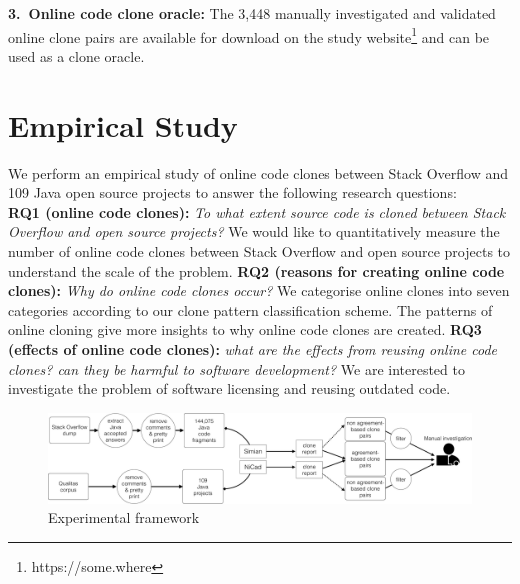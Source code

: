 \documentclass{sig-alternate-05-2015}
\begin{document}
\vspace{0.5ex}%
\noindent\textbf{3.~Online code clone oracle:} The 3,448 manually investigated and validated online clone pairs are available for download on the study website\footnote{https://some.where} and can be used as a clone oracle.

\section{Empirical Study}
We perform an empirical study of online code clones between Stack Overflow and 109 Java open source projects to answer the following research questions: \\ 
\textbf{RQ1 (online code clones):} \textit{To what extent  source code is cloned between Stack Overflow and open source projects?} We would like to quantitatively measure the number of online code clones between Stack Overflow and open source projects to understand the scale of the problem. \newline
\textbf{RQ2 (reasons for creating online code clones):} \textit{Why do online code clones occur?} We categorise online clones into seven categories according to our clone pattern classification scheme. The patterns of online cloning give more insights to why online code clones are created. %
\newline
\textbf{RQ3 (effects of online code clones):} \textit{what are the effects from reusing online code clones? can they be harmful to software development?} %
We are interested to investigate the problem of software licensing and reusing outdated code.

\begin{figure}
	\centering
	\includegraphics[width=0.8\linewidth]{exp_framework}
	\caption{Experimental framework}
	\label{fig:exp_framework}
\end{figure}
\end{document}
